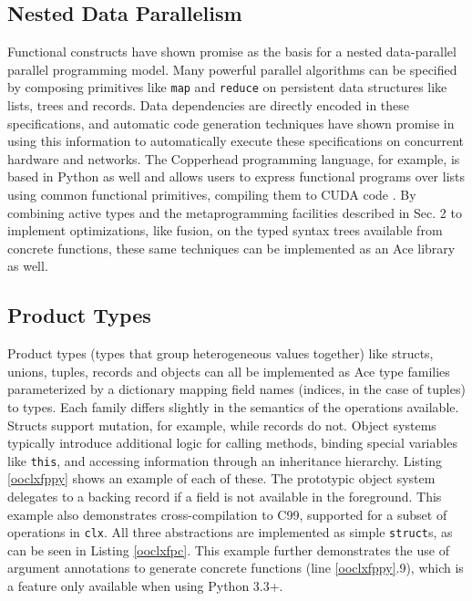 \documentclass[10pt,preprint]{sigplanconf}
\begin{document}
{\subsection{Nested Data Parallelism}
Functional constructs have shown promise as the basis for a nested data-parallel parallel programming model. Many powerful parallel algorithms can be specified by composing primitives like \verb|map| and \verb|reduce| on persistent data structures like lists, trees and records. Data dependencies are directly encoded in these specifications, and automatic code generation techniques have shown promise in using this information to automatically execute these specifications on concurrent hardware and networks. The Copperhead programming language, for example, is based in Python as well and allows users to express functional programs over lists using common functional primitives, compiling them to CUDA code \cite{catanzaro2011copperhead}. By combining active types and the metaprogramming facilities described in Sec. 2 to implement optimizations, like fusion, on the typed syntax trees available from concrete functions, these same techniques can be implemented as an Ace library as well.

\subsection{Product Types}
Product types (types that group heterogeneous values together) like structs, unions, tuples, records and objects can all be implemented as Ace type families  parameterized by a dictionary mapping field names (indices, in the case of tuples) to types. Each family differs slightly in the semantics of the operations available. Structs support mutation, for example, while records do not. Object systems typically introduce additional logic for calling methods, binding special variables like \verb|this|, and accessing information through an inheritance hierarchy. Listing \ref{ooclxfppy} shows an example of each of these. The prototypic object system delegates to a backing record if a field is not available in the foreground. This example also demonstrates cross-compilation to C99, supported for a subset of operations in \verb|clx|. All three abstractions are implemented as simple \verb|struct|s, as can be seen in Listing \ref{ooclxfpc}. This example further demonstrates the use of argument annotations to generate concrete functions (line \ref{ooclxfppy}.9), which is a feature only available when using Python 3.3+. 

}
\end{document}
